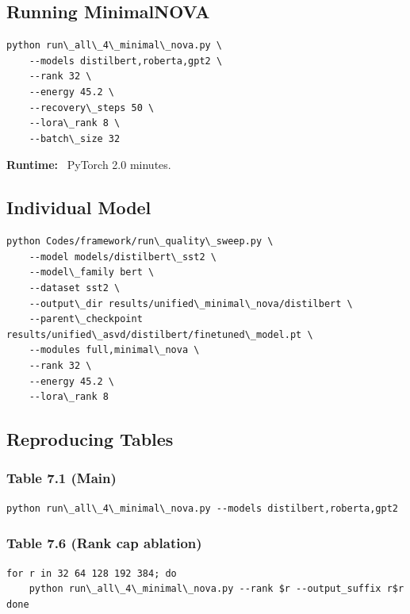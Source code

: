 \subsection{Running MinimalNOVA}

\begin{lstlisting}
python run\_all\_4\_minimal\_nova.py \
    --models distilbert,roberta,gpt2 \
    --rank 32 \
    --energy 45.2 \
    --recovery\_steps 50 \
    --lora\_rank 8 \
    --batch\_size 32
\end{lstlisting}

\textbf{Runtime:} ~PyTorch 2.0 minutes.

\subsection{Individual Model}

\begin{lstlisting}
python Codes/framework/run\_quality\_sweep.py \
    --model models/distilbert\_sst2 \
    --model\_family bert \
    --dataset sst2 \
    --output\_dir results/unified\_minimal\_nova/distilbert \
    --parent\_checkpoint results/unified\_asvd/distilbert/finetuned\_model.pt \
    --modules full,minimal\_nova \
    --rank 32 \
    --energy 45.2 \
    --lora\_rank 8
\end{lstlisting}

\subsection{Reproducing Tables}

\subsubsection{Table 7.1 (Main)}

\begin{lstlisting}
python run\_all\_4\_minimal\_nova.py --models distilbert,roberta,gpt2
\end{lstlisting}

\subsubsection{Table 7.6 (Rank cap ablation)}

\begin{lstlisting}
for r in 32 64 128 192 384; do
    python run\_all\_4\_minimal\_nova.py --rank $r --output_suffix r$r
done
\end{lstlisting}

